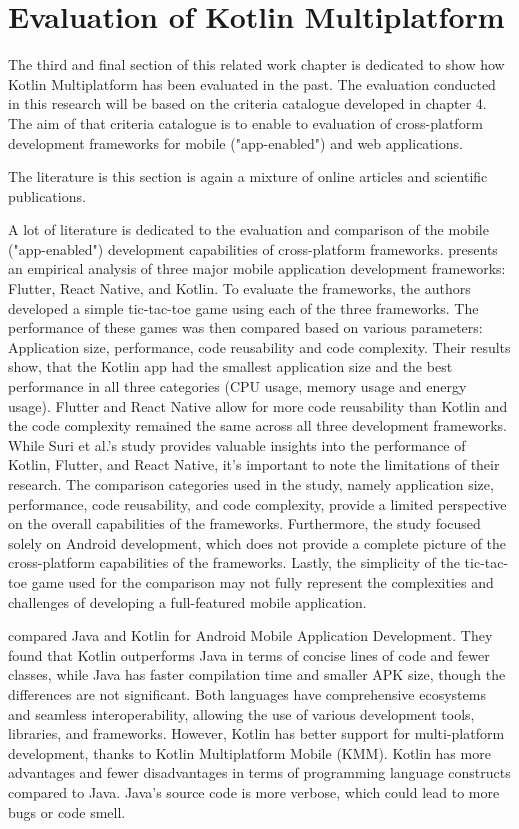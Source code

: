 \section{Evaluation of Kotlin Multiplatform}
The third and final section of this related work chapter is dedicated to show how Kotlin Multiplatform has been evaluated in the past. The evaluation conducted in this research will be based on the criteria catalogue developed in chapter 4. The aim of that criteria catalogue is to enable to evaluation of cross-platform development frameworks for mobile ("app-enabled") and web applications. 

The literature is this section is again a mixture of online articles and scientific publications. 

A lot of literature is dedicated to the evaluation and comparison of the mobile ("app-enabled") development capabilities of cross-platform frameworks. 
\cite{Suri.2023} presents an empirical analysis of three major mobile application development frameworks: Flutter, React Native, and Kotlin. To evaluate the frameworks, the authors developed a simple tic-tac-toe game using each of the three frameworks. The performance of these games was then compared based on various parameters: Application size, performance, code reusability and code complexity. Their results show, that the Kotlin app had the smallest application size and the best performance in all three categories (CPU usage, memory usage and energy usage). Flutter and React Native allow for more code reusability than Kotlin and the code complexity remained the same across all three development frameworks. While Suri et al.'s study provides valuable insights into the performance of Kotlin, Flutter, and React Native, it's important to note the limitations of their research. The comparison categories used in the study, namely application size, performance, code reusability, and code complexity, provide a limited perspective on the overall capabilities of the frameworks. Furthermore, the study focused solely on Android development, which does not provide a complete picture of the cross-platform capabilities of the frameworks. Lastly, the simplicity of the tic-tac-toe game used for the comparison may not fully represent the complexities and challenges of developing a full-featured mobile application.

\cite{Putranto.2020} compared Java and Kotlin for Android Mobile Application Development. They found that Kotlin outperforms Java in terms of concise lines of code and fewer classes, while Java has faster compilation time and smaller APK size, though the differences are not significant. Both languages have comprehensive ecosystems and seamless interoperability, allowing the use of various development tools, libraries, and frameworks. However, Kotlin has better support for multi-platform development, thanks to Kotlin Multiplatform Mobile (KMM). Kotlin has more advantages and fewer disadvantages in terms of programming language constructs compared to Java. Java's source code is more verbose, which could lead to more bugs or code smell.

